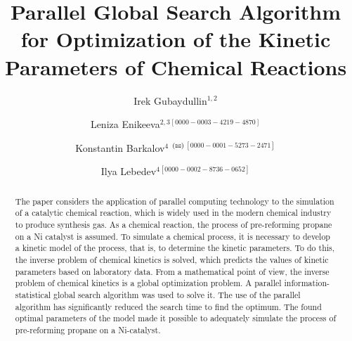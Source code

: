 \documentclass{svproc}
\def\orcidID#1{\unskip$^{[#1]}$}
\def\letter{$^{\textrm{(\Letter)}}$}
\begin{document}
\mainmatter              %
%
\title{Parallel Global Search Algorithm for Optimization of the Kinetic Parameters of Chemical Reactions}
%
%
\author{
Irek Gubaydullin$^{1,2}$\and
Leniza Enikeeva$^{2,3}$\orcidID{0000-0003-4219-4870}
\and
Konstantin Barkalov$^4$ \letter \orcidID{0000-0001-5273-2471}
\and
Ilya Lebedev$^4$\orcidID{0000-0002-8736-0652} 
}

%
%
%


	
\maketitle              %

\begin{abstract}
The paper considers the application of parallel computing technology to the simulation of a catalytic chemical reaction, which is widely used in the modern chemical industry to produce synthesis gas. As a chemical reaction, the process of pre-reforming propane on a Ni catalyst is assumed. To simulate a chemical process, it is necessary to develop a kinetic model of the process, that is, to determine the kinetic parameters. To do this, the inverse problem of chemical kinetics is solved, which predicts the values of kinetic parameters based on laboratory data. From a mathematical point of view, the inverse problem of chemical kinetics is a global optimization problem. A parallel information-statistical global search algorithm was used to solve it. The use of the parallel algorithm has significantly reduced the search time to find the optimum. The found optimal parameters of the model made it possible to adequately simulate the process of pre-reforming propane on a Ni-catalyst.

\end{abstract}
\end{document}
